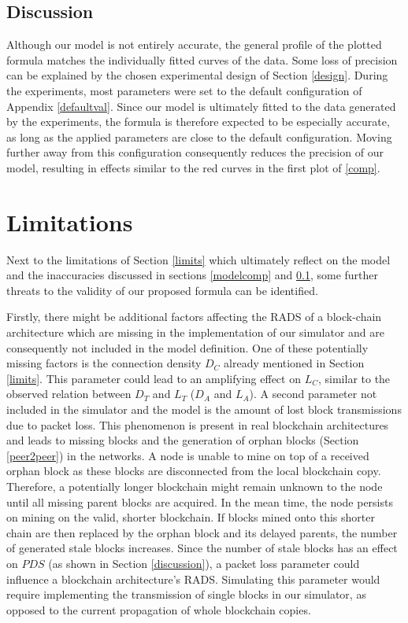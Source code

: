 \documentclass[a4paper,12pt,twoside]{report}
\begin{document}
\subsection{Discussion} \label{modeldisc}
Although our model is not entirely accurate, the general profile of the plotted formula matches the individually fitted curves of the data. Some loss of precision can be explained by the chosen experimental design of Section \ref{design}. During the experiments, most parameters were set to the default configuration of Appendix \ref{defaultval}. Since our model is ultimately fitted to the data generated by the experiments, the formula is therefore expected to be especially accurate, as long as the applied parameters are close to the default configuration. Moving further away from this configuration consequently reduces the precision of our model, resulting in effects similar to the red curves in the first plot of \autoref{comp}. 

\section{Limitations} \label{modellimit}
Next to the limitations of Section \ref{limits} which ultimately reflect on the model and the inaccuracies discussed in sections \ref{modelcomp} and \ref{modeldisc}, some further threats to the validity of our proposed formula can be identified. 

Firstly, there might be additional factors affecting the RADS of a block-chain architecture which are missing in the implementation of our simulator and are consequently not included in the model definition. One of these potentially missing factors is the connection density $D_C$ already mentioned in Section \ref{limits}. This parameter could lead to an amplifying effect on $L_C$, similar to the observed relation between $D_T$ and $L_T$ ($D_A$ and $L_A$). A second parameter not included in the simulator and the model is the amount of lost block transmissions due to packet loss. This phenomenon is present in real blockchain architectures and leads to missing blocks and the generation of orphan blocks (Section \ref{peer2peer}) in the networks. A node is unable to mine on top of a received orphan block as these blocks are disconnected from the local blockchain copy. Therefore, a potentially longer blockchain might remain unknown to the node until all missing parent blocks are acquired. In the mean time, the node persists on mining on the valid, shorter blockchain. If blocks mined onto this shorter chain are then replaced by the orphan block and its delayed parents, the number of generated stale blocks increases. Since the number of stale blocks has an effect on $PDS$ (as shown in Section \ref{discussion}), a packet loss parameter could influence a blockchain architecture's RADS. Simulating this parameter would require implementing the transmission of single blocks in our simulator, as opposed to the current propagation of whole blockchain copies.
\end{document}
